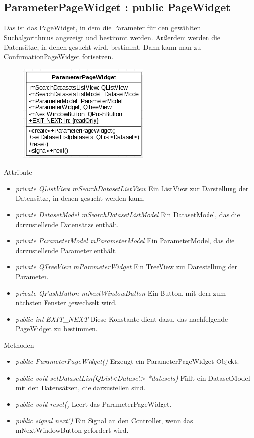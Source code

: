 \subsection*{ParameterPageWidget : public PageWidget}
Das ist das PageWidget, in dem die Parameter für den gewählten \gls{Suchalgorithmus} angezeigt und bestimmt werden. Außerdem werden die Datensätze, in denen gesucht wird, bestimmt. Dann kann man zu ConfirmationPageWidget fortsetzen.

\begin{figure}[H]
	\centering
	\includegraphics[scale=0.5]{img/Klassendiagramm/Klassen/View/ParameterPageWidget}
	\label{fig:parameterPageWidget}
\end{figure}

Attribute
\begin{itemize}
	\item\textit{private QListView mSearchDatasetListView}
	Ein ListView zur Darstellung der Datensätze, in denen gesucht werden kann.
	\item\textit{private DatasetModel mSearchDatasetListModel}
	Ein DatasetModel, das die darzustellende Datensätze enthält.
	\item\textit{private ParameterModel mParameterModel}
	Ein ParameterModel, das die darzustellende Parameter enthält.
	\item\textit{private QTreeView mParameterWidget}
	Ein TreeView zur Darestellung der Parameter.
	\item\textit{private QPushButton mNextWindowButton}
	Ein Button, mit dem zum nächsten Fenster gewechselt wird.
	\item\textit{public int EXIT\_NEXT} 
	Diese Konstante dient dazu, das nachfolgende PageWidget zu bestimmen.    
\end{itemize}

Methoden
\begin{itemize}
	\item\textit{public ParameterPageWidget()}
	Erzeugt ein ParameterPageWidget-Objekt.
	\item\textit{public void setDatasetList(QList<Dataset> *datasets)}
	Füllt ein DatasetModel mit den Datensätzen, die darzustellen sind.
	\item\textit{public void reset()}
	Leert das ParameterPageWidget.
	\item\textit{public signal next()}
	Ein Signal an den Controller, wenn das mNextWindowButton gefordert wird. 
\end{itemize}

